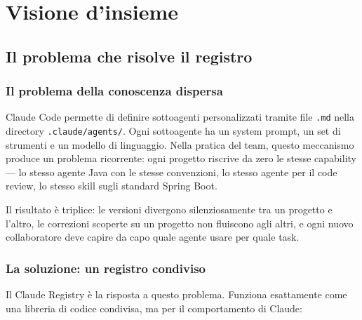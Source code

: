 \documentclass[12pt,a4paper,twoside]{book}
\begin{document}
\mainmatter

\part{Visione d'insieme}

\chapter{Il problema che risolve il registro}

\section{Il problema della conoscenza dispersa}

Claude Code permette di definire sottoagenti personalizzati tramite file \texttt{.md} nella directory \texttt{.claude/agents/}. Ogni sottoagente ha un system prompt, un set di strumenti e un modello di linguaggio. Nella pratica del team, questo meccanismo produce un problema ricorrente: ogni progetto riscrive da zero le stesse capability — lo stesso agente Java con le stesse convenzioni, lo stesso agente per il code review, lo stesso skill sugli standard Spring Boot.

Il risultato è triplice: le versioni divergono silenziosamente tra un progetto e l'altro, le correzioni scoperte su un progetto non fluiscono agli altri, e ogni nuovo collaboratore deve capire da capo quale agente usare per quale task.

\section{La soluzione: un registro condiviso}

Il Claude Registry è la risposta a questo problema. Funziona esattamente come una libreria di codice condivisa, ma per il comportamento di Claude:
\end{document}
